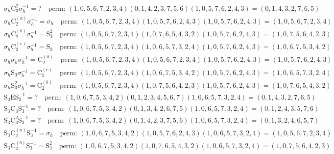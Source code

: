\begin{align*}
& \sigma_{h} \mathrm{C}_{3}^{2} \sigma_{h}^{-1} = ? \quad \text{perm: }(1, 0, 5, 6, 7, 2, 3, 4)(0, 1, 4, 2, 3, 7, 5, 6)(1, 0, 5, 7, 6, 2, 4, 3) = (0, 1, 4, 3, 2, 7, 6, 5) \\
& \sigma_{h} \mathrm{C}_{2}^{(a)} \sigma_{h}^{-1} = \sigma_{h} \quad \text{perm: }(1, 0, 5, 6, 7, 2, 3, 4)(1, 0, 5, 7, 6, 2, 4, 3)(1, 0, 5, 7, 6, 2, 4, 3) = (1, 0, 5, 6, 7, 2, 3, 4) \\
& \sigma_{h} \mathrm{C}_{2}^{(b)} \sigma_{h}^{-1} = \mathrm{S}_{3}^{2} \quad \text{perm: }(1, 0, 5, 6, 7, 2, 3, 4)(1, 0, 7, 6, 5, 4, 3, 2)(1, 0, 5, 7, 6, 2, 4, 3) = (1, 0, 7, 5, 6, 4, 2, 3) \\
& \sigma_{h} \mathrm{C}_{2}^{(c)} \sigma_{h}^{-1} = \mathrm{S}_{3} \quad \text{perm: }(1, 0, 5, 6, 7, 2, 3, 4)(1, 0, 6, 5, 7, 3, 2, 4)(1, 0, 5, 7, 6, 2, 4, 3) = (1, 0, 6, 7, 5, 3, 4, 2) \\
& \sigma_{h} \sigma_{h} \sigma_{h}^{-1} = \mathrm{C}_{2}^{(a)} \quad \text{perm: }(1, 0, 5, 6, 7, 2, 3, 4)(1, 0, 5, 6, 7, 2, 3, 4)(1, 0, 5, 7, 6, 2, 4, 3) = (1, 0, 5, 7, 6, 2, 4, 3) \\
& \sigma_{h} \mathrm{S}_{3} \sigma_{h}^{-1} = \mathrm{C}_{2}^{(c)} \quad \text{perm: }(1, 0, 5, 6, 7, 2, 3, 4)(1, 0, 6, 7, 5, 3, 4, 2)(1, 0, 5, 7, 6, 2, 4, 3) = (1, 0, 6, 5, 7, 3, 2, 4) \\
& \sigma_{h} \mathrm{S}_{3}^{2} \sigma_{h}^{-1} = \mathrm{C}_{2}^{(b)} \quad \text{perm: }(1, 0, 5, 6, 7, 2, 3, 4)(1, 0, 7, 5, 6, 4, 2, 3)(1, 0, 5, 7, 6, 2, 4, 3) = (1, 0, 7, 6, 5, 4, 3, 2) \\
& \mathrm{S}_{3} \mathrm{E} \mathrm{S}_{3}^{-1} = ? \quad \text{perm: }(1, 0, 6, 7, 5, 3, 4, 2)(0, 1, 2, 3, 4, 5, 6, 7)(1, 0, 6, 5, 7, 3, 2, 4) = (0, 1, 4, 3, 2, 7, 6, 5) \\
& \mathrm{S}_{3} \mathrm{C}_{3} \mathrm{S}_{3}^{-1} = ? \quad \text{perm: }(1, 0, 6, 7, 5, 3, 4, 2)(0, 1, 3, 4, 2, 6, 7, 5)(1, 0, 6, 5, 7, 3, 2, 4) = (0, 1, 2, 4, 3, 5, 7, 6) \\
& \mathrm{S}_{3} \mathrm{C}_{3}^{2} \mathrm{S}_{3}^{-1} = ? \quad \text{perm: }(1, 0, 6, 7, 5, 3, 4, 2)(0, 1, 4, 2, 3, 7, 5, 6)(1, 0, 6, 5, 7, 3, 2, 4) = (0, 1, 3, 2, 4, 6, 5, 7) \\
& \mathrm{S}_{3} \mathrm{C}_{2}^{(a)} \mathrm{S}_{3}^{-1} = \sigma_{h} \quad \text{perm: }(1, 0, 6, 7, 5, 3, 4, 2)(1, 0, 5, 7, 6, 2, 4, 3)(1, 0, 6, 5, 7, 3, 2, 4) = (1, 0, 5, 6, 7, 2, 3, 4) \\
& \mathrm{S}_{3} \mathrm{C}_{2}^{(b)} \mathrm{S}_{3}^{-1} = \mathrm{S}_{3}^{2} \quad \text{perm: }(1, 0, 6, 7, 5, 3, 4, 2)(1, 0, 7, 6, 5, 4, 3, 2)(1, 0, 6, 5, 7, 3, 2, 4) = (1, 0, 7, 5, 6, 4, 2, 3) \\

\end{align*}
